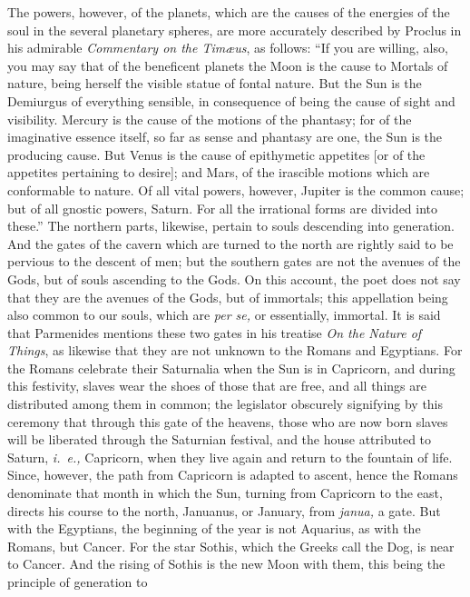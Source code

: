 \documentclass[12pt]{article}
\begin{document}
{The powers, however, of the planets, which are the causes of the energies of
the soul in the several planetary spheres, are more accurately described by
Proclus in his admirable \textit{Commentary on the Tim{\ae}us}, as follows:
``If you are willing, also, you may say that of the beneficent planets the Moon
is the cause to Mortals of nature, being herself the visible statue of fontal
nature. But the Sun is the Demiurgus of everything sensible, in consequence of
being the cause of sight and visibility. Mercury is the cause of the motions of
the phantasy; for of the imaginative essence itself, so far as sense and
phantasy are one, the Sun is the producing cause. But Venus is the cause of
epithymetic appetites [or of the appetites pertaining to desire]; and Mars, of
the irascible motions which are conformable to nature. Of all vital powers,
however, Jupiter is the common cause; but of all gnostic powers, Saturn. For
all the irrational forms are divided into these.''} The northern parts,
likewise, pertain to souls descending into generation. And the gates of the
cavern which are turned to the north are rightly said to be pervious to the
descent of men; but the southern gates are not the avenues of the Gods, but of
souls ascending to the Gods. On this account, the poet does not say that they
are the avenues of the Gods, but of immortals; this appellation being also
common to our souls, which are \textit{per se,} or essentially, immortal. It is
said that Parmenides mentions these two gates in his treatise \textit{On the
Nature of Things}, as likewise that they are not unknown to the Romans and
Egyptians. For the Romans celebrate their Saturnalia when the Sun is in
Capricorn, and during this festivity, slaves wear the shoes of those that are
free, and all things are distributed among them in common; the legislator
obscurely signifying by this ceremony that through this gate of the heavens,
those who are now born slaves will be liberated through the Saturnian festival,
and the house attributed to Saturn, \textit{i.~e.,} Capricorn, when they live
again and return to the fountain of life. Since, however, the path from
Capricorn is adapted to ascent, hence the Romans denominate that month in which
the Sun, turning from Capricorn to the east, directs his course to the north,
Januanus, or January, from \textit{janua,} a gate. But with the Egyptians, the
beginning of the year is not Aquarius, as with the Romans, but Cancer. For the
star Sothis, which the Greeks call the Dog, is near to Cancer. And the rising
of Sothis is the new Moon with them, this being the principle of generation to
\end{document}
